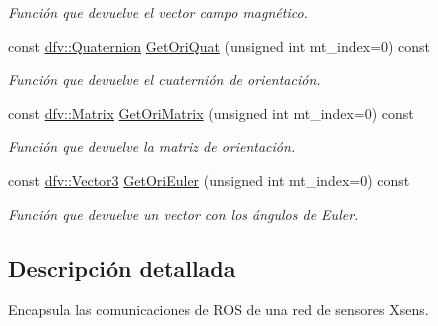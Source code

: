 \begin{DoxyCompactItemize}
\begin{DoxyCompactList}\small\item\em \-Función que devuelve el vector campo magnético. \end{DoxyCompactList}\item 
\hypertarget{classdfv_1_1XsensListener_a882a444ecd1452f22381e20780c97631}{const \hyperlink{classdfv_1_1Quaternion}{dfv\-::\-Quaternion} \hyperlink{classdfv_1_1XsensListener_a882a444ecd1452f22381e20780c97631}{\-Get\-Ori\-Quat} (unsigned int mt\-\_\-index=0) const }\label{classdfv_1_1XsensListener_a882a444ecd1452f22381e20780c97631}

\begin{DoxyCompactList}\small\item\em \-Función que devuelve el cuaternión de orientación. \end{DoxyCompactList}\item 
\hypertarget{classdfv_1_1XsensListener_a8949e2302c992ae4d78132574ccb4c27}{const \hyperlink{classdfv_1_1Matrix}{dfv\-::\-Matrix} \hyperlink{classdfv_1_1XsensListener_a8949e2302c992ae4d78132574ccb4c27}{\-Get\-Ori\-Matrix} (unsigned int mt\-\_\-index=0) const }\label{classdfv_1_1XsensListener_a8949e2302c992ae4d78132574ccb4c27}

\begin{DoxyCompactList}\small\item\em \-Función que devuelve la matriz de orientación. \end{DoxyCompactList}\item 
\hypertarget{classdfv_1_1XsensListener_a5680dd82710f4eb73521c614293da8f4}{const \hyperlink{classdfv_1_1Vector3}{dfv\-::\-Vector3} \hyperlink{classdfv_1_1XsensListener_a5680dd82710f4eb73521c614293da8f4}{\-Get\-Ori\-Euler} (unsigned int mt\-\_\-index=0) const }\label{classdfv_1_1XsensListener_a5680dd82710f4eb73521c614293da8f4}

\begin{DoxyCompactList}\small\item\em \-Función que devuelve un vector con los ángulos de \-Euler. \end{DoxyCompactList}\end{DoxyCompactItemize}


\subsection{\-Descripción detallada}
\-Encapsula las comunicaciones de \-R\-O\-S de una red de sensores \-Xsens. 

